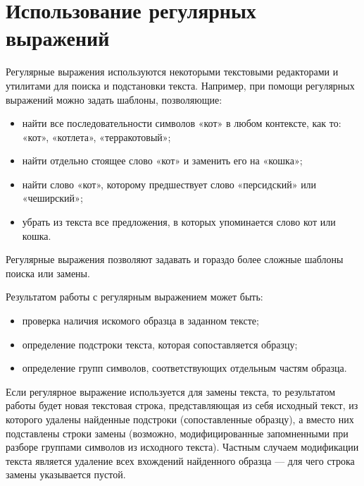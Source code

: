\documentclass[12pt]{report}
\begin{document}
\section{Использование регулярных выражений}
Регулярные выражения используются некоторыми текстовыми редакторами и утилитами для поиска и подстановки текста. Например, при помощи регулярных выражений можно задать шаблоны, позволяющие:
\begin{itemize}
	\item найти все последовательности символов «кот» в любом контексте, как то: «кот», «котлета», «терракотовый»;
	\item найти отдельно стоящее слово «кот» и заменить его на «кошка»;
	\item найти слово «кот», которому предшествует слово «персидский» или «чеширский»;
	\item убрать из текста все предложения, в которых упоминается слово кот или кошка.
\end{itemize}
Регулярные выражения позволяют задавать и гораздо более сложные шаблоны поиска или замены.

Результатом работы с регулярным выражением может быть:
\begin{itemize}
	\item проверка наличия искомого образца в заданном тексте;
	\item определение подстроки текста, которая сопоставляется образцу;
	\item определение групп символов, соответствующих отдельным частям образца.
\end{itemize}
Если регулярное выражение используется для замены текста, то результатом работы будет новая текстовая строка, представляющая из себя исходный текст, из которого удалены найденные подстроки (сопоставленные образцу), а вместо них подставлены строки замены (возможно, модифицированные запомненными при разборе группами символов из исходного текста). Частным случаем модификации текста является удаление всех вхождений найденного образца — для чего строка замены указывается пустой.
\end{document}
